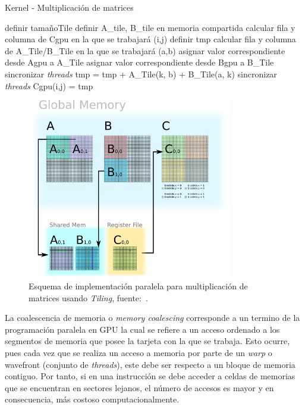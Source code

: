 \begin{algorithm}
\caption{Kernel - Multiplicación de matrices}
\label{alg:4}
\begin{algorithmic}[1]
\State definir tamañoTile
\State definir A\_tile, B\_tile en memoria compartida
\State calcular fila y columna de Cgpu en la que se trabajará (i,j)
\State definir tmp
    \State calcular fila y columna de A\_Tile/B\_Tile en la que se trabajará (a,b)
    \State asignar valor correspondiente desde Agpu a A\_Tile 
    \State asignar valor correspondiente desde Bgpu a B\_Tile 
    \State sincronizar \textit{threads}
        \State tmp = tmp + A\_Tile(k, b) + B\_Tile(a, k)
    \EndFor
    \State sincronizar \textit{threads}
\EndFor
\State Cgpu(i,j) = tmp
\EndProcedure
\end{algorithmic}
\end{algorithm}

\begin{figure}[h!]
\centering
\includegraphics[width=0.8\textwidth]{Figures/opt1.png}
\caption{Esquema de implementación paralela para multiplicación de matrices usando \textit{Tiling}, fuente:~\cite{matrixM}.}
\label{fig:12}
\end{figure}

La coalescencia de memoria o \textit{memory coalescing} corresponde a un termino de la programación paralela en GPU la cual se refiere a un acceso ordenado a los segmentos de memoria que posee la tarjeta con la que se trabaja.
Esto ocurre, pues cada vez que se realiza un acceso a memoria por parte de un \textit{warp} o wavefront (conjunto de \textit{threads}), este debe ser respecto a un bloque de memoria contiguo.
Por tanto, si en una instrucción se debe acceder a celdas de memorias que se encuentran en sectores lejanos, el número de accesos es mayor y en consecuencia, más costoso computacionalmente.

